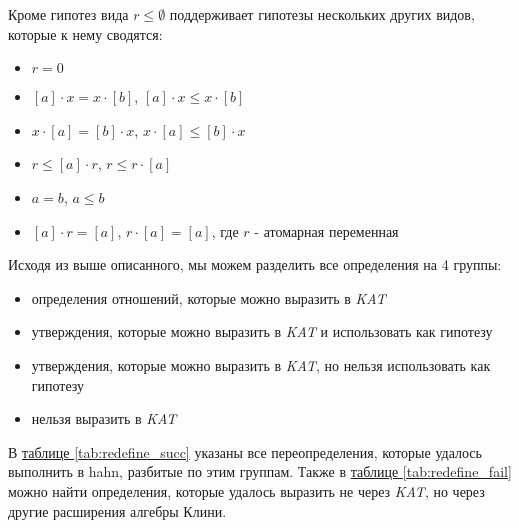 \documentclass[times
              ]{itmo-student-thesis}
\begin{document}
      Кроме гипотез вида $r \leq \emptyset$ \; поддерживает гипотезы нескольких других видов, которые к нему
      сводятся:
      \begin{itemize}
        \item $ r = 0 $
        \item $[a] \cdot x = x \cdot [b]$, $[a] \cdot x \leq x \cdot [b]$
        \item $x \cdot [a] = [b] \cdot x$, $x \cdot [a] \leq [b] \cdot x$
        \item $ r \leq [a] \cdot r $, $ r \leq r \cdot [a]$
        \item $ a = b $, $ a \leq b $
        \item $[a] \cdot r = [a]$, $r \cdot [a] = [a]$, где $r$ - атомарная переменная
      \end{itemize}

      Исходя из выше описанного, мы можем разделить все определения на 4 группы:
      \begin{itemize}
        \item определения отношений, которые можно выразить в \textit{KAT}
        \item утверждения, которые можно выразить в \textit{KAT} и использовать как гипотезу
        \item утверждения, которые можно выразить в \textit{KAT}, но нельзя использовать как гипотезу
        \item нельзя выразить в \textit{KAT}
      \end{itemize}

      В \hyperref[tab:redefine_succ]{таблице \ref{tab:redefine_succ}} указаны все переопределения,
      которые удалось выполнить в hahn, разбитые по этим группам.
      Также в \hyperref[tab:redefine_fail]{таблице \ref{tab:redefine_fail}} можно найти определения, которые
      удалось выразить не через \textit{KAT}, но через другие расширения алгебры Клини.
\end{document}
